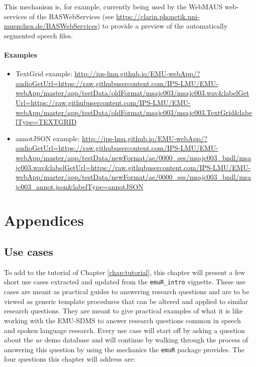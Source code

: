 \documentclass[
]{book}
\providecommand{\tightlist}{%
  \setlength{\itemsep}{0pt}\setlength{\parskip}{0pt}}
\begin{document}
This mechanism is, for example, currently being used by the WebMAUS web-services of the BASWebServices (see \url{https://clarin.phonetik.uni-muenchen.de/BASWebServices}) to provide a preview of the automatically segmented speech files.

\hypertarget{examples-1}{%
\subsection{Examples}\label{examples-1}}

\begin{itemize}
\tightlist
\item
  TextGrid example: \url{http://ips-lmu.github.io/EMU-webApp/?audioGetUrl=https://raw.githubusercontent.com/IPS-LMU/EMU-webApp/master/app/testData/oldFormat/msajc003/msajc003.wav\&labelGetUrl=https://raw.githubusercontent.com/IPS-LMU/EMU-webApp/master/app/testData/oldFormat/msajc003/msajc003.TextGrid\&labelType=TEXTGRID}
\item
  annotJSON example: \url{http://ips-lmu.github.io/EMU-webApp/?audioGetUrl=https://raw.githubusercontent.com/IPS-LMU/EMU-webApp/master/app/testData/newFormat/ae/0000_ses/msajc003_bndl/msajc003.wav\&labelGetUrl=https://raw.githubusercontent.com/IPS-LMU/EMU-webApp/master/app/testData/newFormat/ae/0000_ses/msajc003_bndl/msajc003_annot.json\&labelType=annotJSON}
\end{itemize}

\hypertarget{part-appendices}{%
\part{Appendices}\label{part-appendices}}

\hypertarget{app-chap:useCases}{%
\chapter{Use cases}\label{app-chap:useCases}}

To add to the tutorial of Chapter \ref{chap:tutorial}, this chapter will present a few short use cases extracted and updated from the \texttt{emuR\_intro} vignette. These use cases are meant as practical guides to answering research questions and are to be viewed as generic template procedures that can be altered and applied to similar research questions. They are meant to give practical examples of what it is like working with the EMU-SDMS to answer research questions common in speech and spoken language research. Every use case will start off by asking a question about the \emph{ae} demo database and will continue by walking through the process of answering this question by using the mechanics the \texttt{emuR} package provides. The four questions this chapter will address are:
\end{document}
